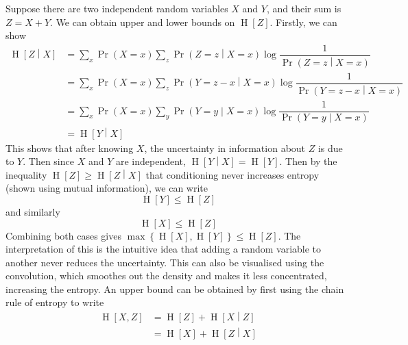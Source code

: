 \documentclass[11pt]{report} %
\begin{document}
Suppose there are two independent random variables $X$ and $Y$, and their sum is $Z = X + Y$. We can obtain upper and lower bounds on $\operatorname{H}\left[Z\right]$. Firstly, we can show
\begin{align}
\operatorname{H}\left[Z\middle|X\right] &= \sum_{x}\operatorname{Pr}\left(X = x\right)\sum_{z}\operatorname{Pr}\left(Z = z\middle|X = x\right)\log\dfrac{1}{\operatorname{Pr}\left(Z = z\middle|X = x\right)} \\
&= \sum_{x}\operatorname{Pr}\left(X = x\right)\sum_{z}\operatorname{Pr}\left(Y = z - x\middle|X = x\right)\log\dfrac{1}{\operatorname{Pr}\left(Y = z - x\middle|X = x\right)} \\
&= \sum_{x}\operatorname{Pr}\left(X = x\right)\sum_{y}\operatorname{Pr}\left(Y = y\middle|X = x\right)\log\dfrac{1}{\operatorname{Pr}\left(Y = y\middle|X = x\right)} \\
&= \operatorname{H}\left[Y\middle|X\right]
\end{align}
This shows that after knowing $X$, the uncertainty in information about $Z$ is due to $Y$. Then since $X$ and $Y$ are independent, $\operatorname{H}\left[Y\middle|X\right] = \operatorname{H}\left[Y\right]$. Then by the inequality $\operatorname{H}\left[Z\right] \geq \operatorname{H}\left[Z\middle|X\right]$ that conditioning never increases entropy (shown using mutual information), we can write
\begin{equation}
\operatorname{H}\left[Y\right] \leq \operatorname{H}\left[Z\right]
\end{equation}
and similarly 
\begin{equation}
\operatorname{H}\left[X\right] \leq \operatorname{H}\left[Z\right]
\end{equation}
Combining both cases gives $\max\left\{\operatorname{H}\left[X\right], \operatorname{H}\left[Y\right]\right\} \leq \operatorname{H}\left[Z\right]$. The interpretation of this is the intuitive idea that adding a random variable to another never reduces the uncertainty. This can also be visualised using the convolution, which smoothes out the density and makes it less concentrated, increasing the entropy. An upper bound can be obtained by first using the chain rule of entropy to write
\begin{align}
\operatorname{H}\left[X, Z\right] &= \operatorname{H}\left[Z\right] + \operatorname{H}\left[X\middle|Z\right] \\
&= \operatorname{H}\left[X\right] + \operatorname{H}\left[Z\middle|X\right]
\end{align}
\end{document}

